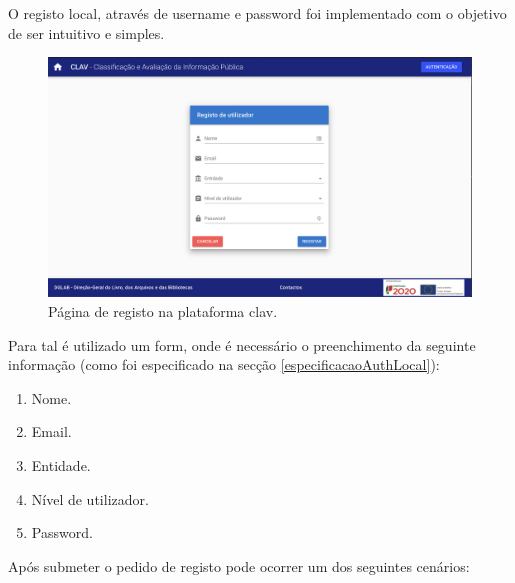 O registo local, através de username e password foi implementado com o objetivo de ser intuitivo e simples. 

\begin{figure}[h!]
    \centering
    \includegraphics[width=\textwidth]{img/clav/authlocal/registo.png}
    \caption{Página de registo na plataforma \gls{clav}.}
    \label{fig:paginaRegistoLocal}
\end{figure}

Para tal é utilizado um form, onde é necessário o preenchimento da seguinte informação (como foi especificado na secção \ref{especificacaoAuthLocal}):
\begin{enumerate}
    \item Nome.
    \item Email.
    \item Entidade.
    \item Nível de utilizador.
    \item Password.
\end{enumerate}

Após submeter o pedido de registo pode ocorrer um dos seguintes cenários:


